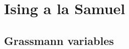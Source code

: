 \chapter{Ising a la Samuel}
\section{Grassmann variables}


\newcommand{\mode}{flavor }
\newcommand{\modes}{flavors }
\newcommand{\hdag}[1]{h^{x}_{#1}}
\newcommand{\vdag}[1]{v^{x}_{#1}}
\newcommand{\hnag}[1]{h^{o}_{#1}}
\newcommand{\vnag}[1]{v^{o}_{#1}}
\newcommand{\Hdag}[1]{H^{x}_{#1}}
\newcommand{\Vdag}[1]{V^{x}_{#1}}
\newcommand{\Hnag}[1]{H^{o}_{#1}}
\newcommand{\Vnag}[1]{V^{o}_{#1}}

\newcommand{\cP}{{\cal P}}
\newcommand{\sign}[1]{\text{sgn}\left\{#1\right\}}




\renewcommand{\xx}[1]{\boldsymbol  x_{#1}}
\newcommand{\ex}{\boldsymbol  e_{x}}
\newcommand{\ey}{\boldsymbol  e_{y}}

\newcommand{\Dep}{{\cal D}_{\eta \psi}}
\newcommand{\Dept}{\tilde {\cal D}_{\eta \psi}}
\newcommand{\Depx}{{\cal D}_{\eta \psi}^{\canceledk{I},\canceledk{J}}}
\newcommand{\Deta}{{\cal D}_{\eta}}
\newcommand{\Detax}{{\cal D}_{\eta}^{\canceledk{I}}}
\newcommand{\Detat}{\tilde {\cal D}_{\eta}}
\newcommand{\Dxi}{{\cal D}_{\xi}}

\newcommand{\Int}{\int\ldots\int}
\newcommand{\Disingi}{{\cal D}_{hv}}
\newcommand{\Pf}[1]{\text{Pf}\left(#1\right)}
\newcommand{\Det}[1]{\text{det}\left(#1\right)}

\newcommand{\set}[2]{\left\{#1_{1},#1_{2},\ldots,#1_{#2}\right\}}
\newcommand{\pairset}[3]{\left\{(#1_{1},#2_{1}),(#1_{2},#2_{2})\ldots,(#1_{#3},#2_{#3})\right\}}

\newcommand{\Set}[2]{\left\{#1_{l}\right\}_{l=1:#2}}
\newcommand{\Pairset}[3]{\left\{(#1_{l},#2_{l})\right\}_{l=1:#3}}



\newcommand{\compset}[3]{#1_{1} #2 #1_{2} #2 \ldots #2 #1_{#3}}

\newcommand{\setprod}[4]{#1_{#2_{1}#3_{1}}\;#1_{#2_{2}#3_{2}}\;\ldots\;  #1_{#2_{#4}#3_{#4}}}
\newcommand{\Setprod}[4]{\prod_{l=1}^{#4}\;#1_{#2_{l}#3_{l}}}


